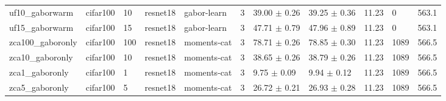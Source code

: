 \begin{tabular}{lllllllllll}
uf10_gaborwarm & cifar100 & 10 & resnet18 & gabor-learn & 3 & 39.00 $\pm$ 0.26 & 39.25 $\pm$ 0.36 & 11.23 & 0 & 563.1 \\
uf15_gaborwarm & cifar100 & 15 & resnet18 & gabor-learn & 3 & 47.71 $\pm$ 0.79 & 47.96 $\pm$ 0.89 & 11.23 & 0 & 563.1 \\
zca100_gaboronly & cifar100 & 100 & resnet18 & moments-cat & 3 & 78.71 $\pm$ 0.26 & 78.85 $\pm$ 0.30 & 11.23 & 1089 & 566.5 \\
zca10_gaboronly & cifar100 & 10 & resnet18 & moments-cat & 3 & 38.65 $\pm$ 0.26 & 38.79 $\pm$ 0.26 & 11.23 & 1089 & 566.5 \\
zca1_gaboronly & cifar100 & 1 & resnet18 & moments-cat & 3 & 9.75 $\pm$ 0.09 & 9.94 $\pm$ 0.12 & 11.23 & 1089 & 566.5 \\
zca5_gaboronly & cifar100 & 5 & resnet18 & moments-cat & 3 & 26.72 $\pm$ 0.21 & 26.93 $\pm$ 0.28 & 11.23 & 1089 & 566.5 \\
\bottomrule
\end{tabular}

